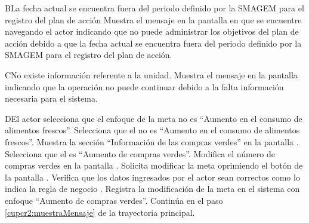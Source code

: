    \begin{UCtrayectoriaA}{B}{La fecha actual se encuentra fuera del periodo definido por la SMAGEM para el registro del plan de acción}
    \UCpaso[\UCsist] Muestra el mensaje  en la pantalla en que se encuentre navegando el actor indicando que no puede administrar los objetivos del plan de acción debido a que la fecha actual se encuentra fuera del periodo definido por la SMAGEM para el registro del plan de acción.
 \end{UCtrayectoriaA}


 
\begin{UCtrayectoriaA}{C}{No existe información referente a la unidad.}
	\UCpaso[\UCsist] Muestra el mensaje  en la pantalla  indicando que la operación no puede continuar debido a la falta información necesaria para el sistema.
\end{UCtrayectoriaA}

\begin{UCtrayectoriaA}{D}{El actor selecciona que el enfoque de la meta no es ``Aumento en el consumo de alimentos frescos''.}
	\UCpaso[\UCactor] Selecciona que el  no es ``Aumento en el consumo de alimentos frescos''. 
	\UCpaso[\UCsist] Muestra la sección ``Información de las compras verdes'' en la pantalla .
	\UCpaso[\UCactor] Selecciona que el  es ``Aumento de compras verdes''. 
	\UCpaso[\UCactor] Modifica el número de compras verdes en la pantalla .
	\UCpaso[\UCactor] Solicita modificar la meta oprimiendo el botón  de la pantalla .  
	\UCpaso[\UCsist] Verifica que los datos ingresados por el actor sean correctos como lo indica la regla de negocio .   
	\UCpaso[\UCsist] Registra la modificación de la meta en el sistema con enfoque ``Aumento de compras verdes''.
	\UCpaso[] Continúa en el paso \ref{cupcr2:muestraMensaje} de la trayectoria principal.
\end{UCtrayectoriaA}

